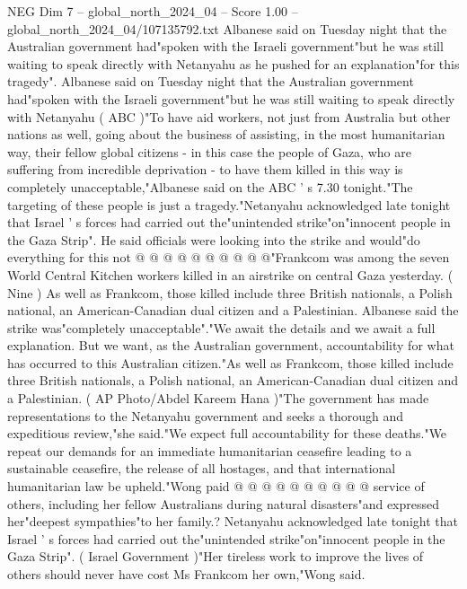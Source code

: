 \begin{textsample}{NEG Dim 7 – global\_north\_2024\_04 – Score 1.00 – global\_north\_2024\_04/107135792.txt}  \label{ex:f7_neg_391}
Albanese said on Tuesday night that the Australian government had"spoken with the Israeli government"but he was still waiting to speak directly with Netanyahu as he pushed for an explanation"for this tragedy".
Albanese said on Tuesday night that the Australian government had"spoken with the Israeli government"but he was still waiting to speak directly with Netanyahu ( ABC )"To have aid workers, not just from Australia but other nations as well, going about the business of assisting, in the most humanitarian way, their fellow global citizens - in this case the people of Gaza, who are suffering from incredible deprivation - to have them killed in this way is completely unacceptable,"Albanese said on the ABC ' s 7.30 tonight."The targeting of these people is just a tragedy."Netanyahu acknowledged late tonight that Israel ' s forces had carried out the"unintended strike"on"innocent people in the Gaza Strip".
He said officials were looking into the strike and would"do everything for this not @ @ @ @ @ @ @ @ @ @"Frankcom was among the seven World Central Kitchen workers killed in an airstrike on central Gaza yesterday. ( Nine ) As well as Frankcom, those killed include three British nationals, a Polish national, an American-Canadian dual citizen and a Palestinian.
Albanese said the strike was"completely unacceptable"."We await the details and we await a full explanation.
But we want, as the Australian government, accountability for what has occurred to this Australian citizen."As well as Frankcom, those killed include three British nationals, a Polish national, an American-Canadian dual citizen and a Palestinian. ( AP Photo/Abdel Kareem Hana )"The government has made representations to the Netanyahu government and seeks a thorough and expeditious review,"she said."We expect full accountability for these deaths."We repeat our demands for an immediate humanitarian ceasefire leading to a sustainable ceasefire, the release of all hostages, and that international humanitarian law be upheld."Wong paid @ @ @ @ @ @ @ @ @ @ service of others, including her fellow Australians during natural disasters"and expressed her"deepest sympathies"to her family.?
Netanyahu acknowledged late tonight that Israel ' s forces had carried out the"unintended strike"on"innocent people in the Gaza Strip". ( Israel Government )"Her tireless work to improve the lives of others should never have cost Ms Frankcom her own,"Wong said.

\end{textsample}
